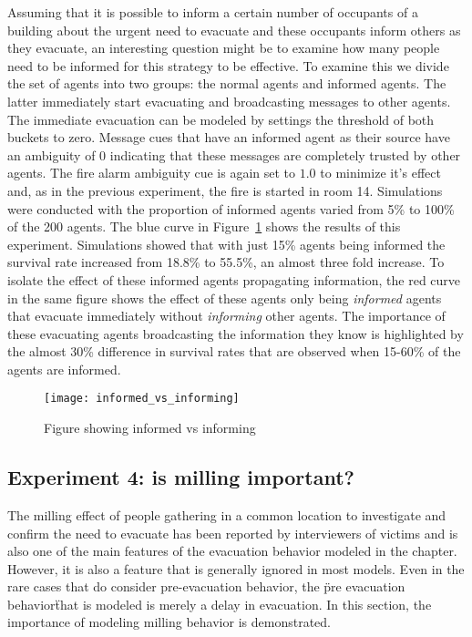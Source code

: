 Assuming that it is possible to inform a certain number of occupants of a building about the urgent need to evacuate and these occupants inform others as they evacuate, an interesting question might be to examine how many people need to be informed for this strategy to be effective. To examine this we divide the set of agents into two groups: the normal agents and informed agents. The latter immediately start evacuating and broadcasting messages to other agents. The immediate evacuation can be modeled by settings the threshold of both buckets to zero. Message cues that have an informed agent as their source have an ambiguity of 0 indicating that these messages are completely trusted by other agents. The fire alarm ambiguity cue is again set to $1.0$ to minimize it's effect and, as in the previous experiment, the fire is started in room 14. Simulations were conducted with the proportion of informed agents varied from 5\% to 100\% of the 200 agents. The blue curve in Figure~\ref{fig:informed_vs_informing} shows the results of this experiment. Simulations showed that with just 15\% agents being informed the survival rate increased from 18.8\% to 55.5\%, an almost three fold increase. To isolate the effect of these informed agents propagating information, the red curve in the same figure shows the effect of these agents only being \emph{informed} agents that evacuate immediately without \emph{informing} other agents. The importance of these evacuating agents broadcasting the information they know is highlighted by the almost 30\% difference in survival rates that are observed when 15-60\% of the agents are informed.

\begin{figure}[!tb]
    \begin{center}
        \texttt{[image: informed\_vs\_informing]}
    \end{center}
    \caption{Figure showing informed vs informing}
    \label{fig:informed_vs_informing}
\end{figure}


\subsection{Experiment 4: is milling important?} %
\label{sec:experiment_4_modeling_the_effect_of_pre_evacuation_behavior}

The milling effect of people gathering in a common location to investigate and confirm the need to evacuate has been reported by interviewers of victims and is also one of the main features of the evacuation behavior modeled in the chapter. However, it is also a feature that is generally ignored in most models. Even in the rare cases that do consider pre-evacuation behavior, the \"pre evacuation behavior\" that is modeled is merely a delay in evacuation. In this section, the importance of modeling milling behavior is demonstrated.

